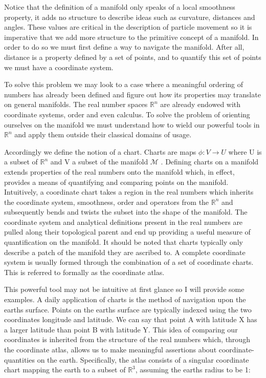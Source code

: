 \documentclass{article}
\begin{document}
  Notice that the definition of a manifold only speaks of a local smoothness property, it adds no structure to describe ideas such as curvature, distances and angles. These values are critical in the description of particle movement so it is imperative that we add more structure to the primitive concept of a manifold. In order to do so we must first define a way to navigate the manifold. After all, distance is a property defined by a set of points, and to quantify this set of points we must have a coordinate system. 

  To solve this problem we may look to a case where a meaningful ordering of numbers has already been defined and figure out how its properties may translate on general manifolds. The real number spaces $\mathbb R^n$ are already endowed with coordinate systems, order and even calculus. To solve the problem of orienting ourselves on the manifold we must understand how to wield our powerful tools in $\mathbb R^n$ and apply them outside their classical domains of usage.

  Accordingly we define the notion of a chart. Charts are maps $\phi : V \rightarrow U$ where U is a subset of $\mathbb R^n$ and V a subset of the manifold $\mathcal M$ . Defining charts on a manifold extends properties of the real numbers onto the manifold which, in effect, provides a means of quantifying and comparing points on the manifold. Intuitively, a coordinate chart takes a region in the real numbers which inherits the coordinate system, smoothness, order and operators from the $\mathbb R^n$ and subsequently bends and twists the subset into the shape of the manifold. The coordinate system and analytical definitions present in the real numbers are pulled along their topological parent and end up providing a useful measure of quantification on the manifold. It should be noted that charts typically only describe a patch of the manifold they are ascribed to. A complete coordinate system is usually formed through the combination of a set of coordinate charts. This is referred to formally as the coordinate atlas.

  This powerful tool may not be intuitive at first glance so I will provide some examples. A daily application of charts is the method of navigation upon the earths surface. Points on the earths surface are typically indexed using the two coordinates longitude and latitude. We can say that point A with latitude X has a larger latitude than point B with latitude Y. This idea of comparing our coordinates is inherited from the structure of the real numbers which, through the coordinate atlas, allows us to make meaningful assertions about coordinate-quantities on the earth. Specifically, the atlas consists of a singular coordinate chart mapping the earth to a subset of $\mathbb R^3$, assuming the earths radius to be 1:
\end{document}
